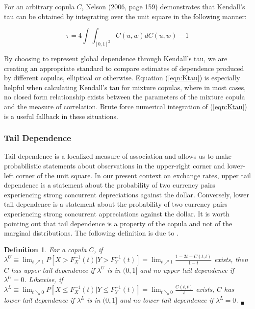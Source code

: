 \documentclass[12pt]{article}
\newtheorem{defn}{Definition}
\begin{document}
For an arbitrary copula $C$, Nelson (2006, page 159) demonstrates that Kendall's tau can be obtained by integrating over the unit square in the following manner:

\begin{equation} \label{eqn:Ktau}
	\tau = 4\int\int_{\left[0,1\right]^{2}}C\left(u,w\right)dC\left(u,w\right) - 1 
\end{equation}

By choosing to represent global dependence through Kendall's tau, we are creating an appropriate standard to compare estimates of dependence produced by different copulas, elliptical or otherwise. Equation (\ref{eqn:Ktau}) is especially helpful when calculating Kendall's tau for mixture copulas, where in most cases, no closed form relationship exists between the parameters of the mixture copula and the measure of correlation. Brute force numerical integration of (\ref{eqn:Ktau}) is a useful fallback in these situations.

\subsubsection{Tail Dependence}

Tail dependence is a localized measure of association and allows us to make probabilistic statements about observations in the upper-right corner and lower-left corner of the unit square. In our present context on exchange rates, upper tail dependence is a statement about the probability of two currency pairs experiencing strong concurrent depreciations against the dollar. Conversely, lower tail dependence is a statement about the probability of two currency pairs experiencing strong concurrent appreciations against the dollar. It is worth pointing out that tail dependence is a property of the copula and not of the marginal distributions. The following definition is due to \cite{Joe_1997}.

\begin{defn} \label{defn:tail_dep}
	For a copula $C$, if $\lambda^{U}\equiv\lim_{t\nearrow 1}P\left[X > F_{X}^{-1}\left(t\right) | Y > F_{Y}^{-1}\left(t\right)\right] = \lim_{t\nearrow 1}\frac{1-2t+C\left(t,t\right)}{1-t}$ exists, then $C$ has upper tail dependence if $\lambda^{U}$ is in $(0,1]$ and no upper tail dependence if $\lambda^{U}=0$. Likewise, if $\lambda ^{L}\equiv \lim_{t\searrow 0}P\left[X\leq F_{X}^{-1}\left(t\right) | Y\leq F_{Y}^{-1}\left(t\right)\right] =\lim_{t\searrow 0}\frac{C\left(t,t\right)}{t}$ exists, $C$ has lower tail dependence if $\lambda ^{L}$ is in $(0,1]$ and no lower tail dependence if $\lambda^{L} = 0$. $_{\blacksquare}$
\end{defn}
\end{document}
